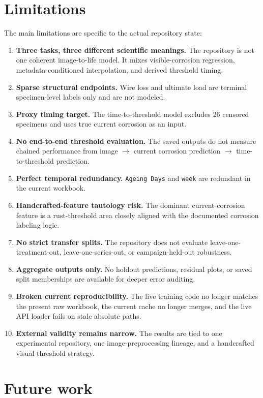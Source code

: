 \documentclass[11pt]{article}
\begin{document}
\section{Limitations}

The main limitations are specific to the actual repository state:
\begin{enumerate}
  \item \textbf{Three tasks, three different scientific meanings.} The repository is not one coherent image-to-life model. It mixes visible-corrosion regression, metadata-conditioned interpolation, and derived threshold timing.
  \item \textbf{Sparse structural endpoints.} Wire loss and ultimate load are terminal specimen-level labels only and are not modeled.
  \item \textbf{Proxy timing target.} The time-to-threshold model excludes 26 censored specimens and uses true current corrosion as an input.
  \item \textbf{No end-to-end threshold evaluation.} The saved outputs do not measure chained performance from image \(\rightarrow\) current corrosion prediction \(\rightarrow\) time-to-threshold prediction.
  \item \textbf{Perfect temporal redundancy.} \texttt{Ageing Days} and \texttt{week} are redundant in the current workbook.
  \item \textbf{Handcrafted-feature tautology risk.} The dominant current-corrosion feature is a rust-threshold area closely aligned with the documented corrosion labeling logic.
  \item \textbf{No strict transfer splits.} The repository does not evaluate leave-one-treatment-out, leave-one-series-out, or campaign-held-out robustness.
  \item \textbf{Aggregate outputs only.} No holdout predictions, residual plots, or saved split memberships are available for deeper error auditing.
  \item \textbf{Broken current reproducibility.} The live training code no longer matches the present raw workbook, the current cache no longer merges, and the live API loader fails on stale absolute paths.
  \item \textbf{External validity remains narrow.} The results are tied to one experimental repository, one image-preprocessing lineage, and a handcrafted visual threshold strategy.
\end{enumerate}

\section{Future work}
\end{document}
